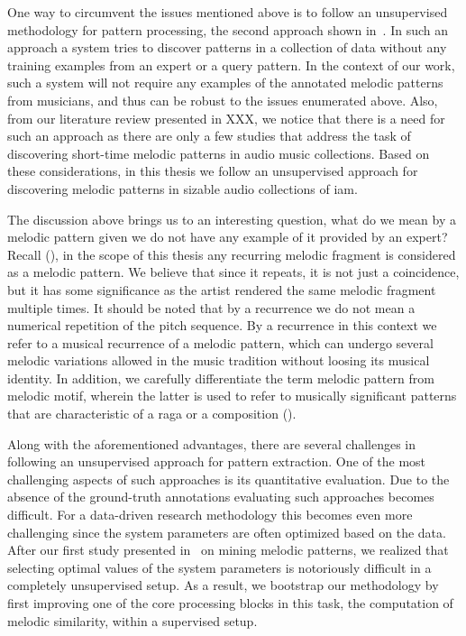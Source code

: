 One way to circumvent the issues mentioned above is to follow an unsupervised methodology for pattern processing, the second approach shown in~. In such an approach a system tries to discover patterns in a collection of data without any training examples from an expert or a query pattern. In the context of our work, such a system will not require any examples of the annotated melodic patterns from musicians, and thus can be robust to the issues enumerated above. Also, from our literature review presented in XXX, we notice that there is a need for such an approach as there are only a few studies that address the task of discovering short-time melodic patterns in audio music collections. Based on these considerations, in this thesis we follow an unsupervised approach for discovering melodic patterns in sizable audio collections of \gls{iam}. 

The discussion above brings us to an interesting question, what do we mean by a melodic pattern given we do not have any example of it provided by an expert? Recall (), in the scope of this thesis any recurring melodic fragment is considered as a melodic pattern. We believe that since it repeats, it is not just a coincidence, but it has some significance as the artist rendered the same melodic fragment multiple times. It should be noted that by a recurrence we do not mean a numerical repetition of the pitch sequence. By a recurrence in this context we refer to a musical recurrence of a melodic pattern, which can undergo several melodic variations allowed in the music tradition without loosing its musical identity. In addition, we carefully differentiate the term melodic pattern from melodic motif, wherein the latter is used to refer to musically significant patterns that are characteristic of a \gls{raga} or a composition (). 

Along with the aforementioned advantages, there are several challenges in following an unsupervised approach for pattern extraction. One of the most challenging aspects of such approaches is its quantitative evaluation. Due to the absence of the ground-truth annotations evaluating such approaches becomes difficult. For a data-driven research methodology this becomes even more challenging since the system parameters are often optimized based on the data. After our first study presented in~\cite{gulati_SITIS_2014} on mining melodic patterns, we realized that selecting optimal values of the system parameters is notoriously difficult in a completely unsupervised setup. As a result, we bootstrap our methodology by first improving one of the core processing blocks in this task, the computation of melodic similarity, within a supervised setup. 

